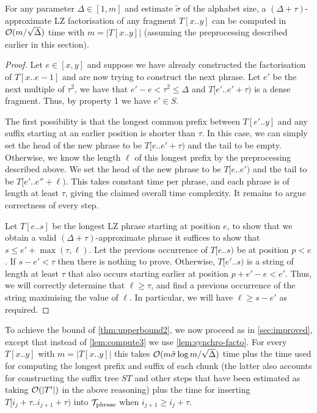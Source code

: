 \begin{lemma}
\label{lem:synchro-facto}
For any parameter $\Delta \in [1,m]$ and estimate $\tilde{\sigma}$ of the alphabet size, a $(\Delta+\tau)$-approximate LZ factorisation of any
fragment $T[x..y]$ can be computed in $\mathcal{O}(m/\sqrt{\Delta})$ time with $m=|T[x..y]|$ (assuming the preprocessing
described earlier in this section).
\end{lemma}

\begin{proof}
Let $e \in [x,y]$ and suppose we have already constructed the factorisation of $T[x..e-1]$ and are now trying to construct the next phrase.
Let $e'$ be the next multiple of $\tau^{2}$, we have that $e'-e < \tau^{2}\leq \Delta$ and $T[e'.. e'+\tau)$ is a dense fragment.
Thus, by property 1 we have $e'\in S$.

The first possibility is that the longest common prefix between $T[e'..y]$ and any suffix starting at an earlier position is shorter
than $\tau$. In this case, we can simply set the head of the new phrase to be $T[e..e'+\tau)$ and the tail to be empty.
Otherwise, we know the length $\ell$ of this longest prefix by the preprocessing described above.
We set the head of the new phrase to be $T[e..e')$ and the tail to be $T[e'..e''+\ell)$. This takes constant time per phrase, and each
phrase is of length at least $\tau$, giving the claimed overall time complexity. It remains to argue correctness of every step.

Let $T[e..s]$ be the longest LZ phrase starting at position $e$, to show that we obtain a valid $(\Delta+\tau)$-approximate 
phrase it suffices to show that $s \leq  e'+ \max(\tau,\ell)$.
Let the previous occurrence of $T[e..s)$ be at position $p<e$. If $s-e' < \tau$ then there is nothing to prove.
Otherwise, $T[e'..s)$ is a string of length at least $\tau$ that also occurs starting earlier at position $p+e'-e < e'$.
Thus, we will correctly determine that $\ell \geq \tau$, and find a previous occurrence of the string maximising
the value of $\ell$. In particular, we will have $\ell \geq s-e'$ as required.
\end{proof}

To achieve the bound of \cref{thm:upperbound2}, we now proceed as in \cref{sec:improved}, except that instead
of \cref{lem:compute3} we use \cref{lem:synchro-facto}. For every $T[x..y]$ with $m=|T[x..y]|$
this takes $\mathcal{O}(m\tilde{\sigma}\log m/\sqrt{\Delta})$ time plus the time used for computing the longest
prefix and suffix of each chunk (the latter also accounts for constructing the suffix tree $ST$ and other steps that have
been estimated as taking $\mathcal{O}(|T'|)$ in the above reasoning)
plus the time for inserting $T[i_{j}+\tau.. i_{j+1}+\tau)$ into $\mathcal{T}_{\mathrm{phrase}}$ when $i_{j+1}\geq i_{j}+\tau$.


